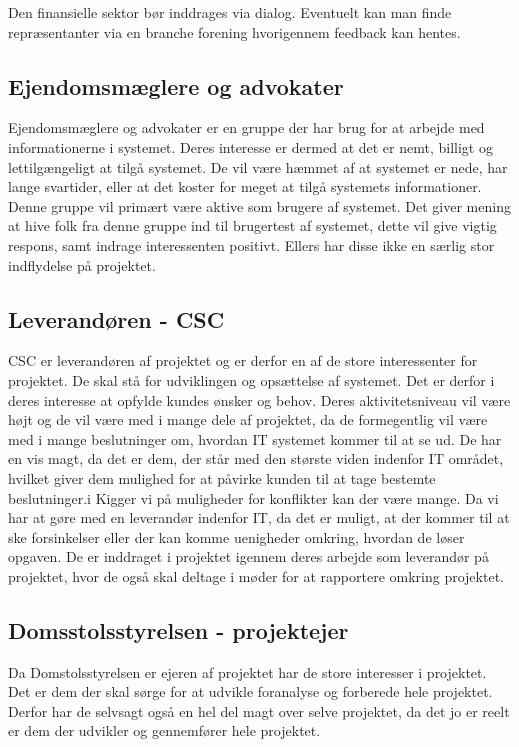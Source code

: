 \documentclass[10pt,a4paper,danish]{article}
\begin{document}
Den finansielle sektor bør inddrages via dialog. Eventuelt kan man finde
repræsentanter via en branche forening hvorigennem feedback kan hentes.

\subsection{Ejendomsmæglere og advokater}

Ejendomsmæglere og advokater er en gruppe der har brug for at arbejde med
informationerne i systemet.
Deres interesse er dermed at det er nemt, billigt og lettilgængeligt at tilgå
systemet. De vil være hæmmet af at systemet er nede, har lange svartider, eller
at det koster for meget at tilgå systemets informationer.
Denne gruppe vil primært være aktive som brugere af systemet.
Det giver mening at hive folk fra denne gruppe ind til brugertest af systemet,
dette vil give vigtig respons, samt indrage interessenten positivt.
Ellers har disse ikke en særlig stor indflydelse på projektet.

\subsection{Leverandøren - CSC}
CSC er leverandøren af projektet og er derfor en af de store interessenter for projektet. De skal stå for udviklingen og opsættelse af systemet. Det er derfor i deres interesse at opfylde kundes ønsker og behov. Deres aktivitetsniveau vil være højt og de vil være med i mange dele af projektet, da de formegentlig vil være med i mange beslutninger om, hvordan IT systemet kommer til at se ud.
De har en vis magt, da det er dem, der står med den største viden indenfor IT området, hvilket giver dem mulighed for at påvirke kunden til at tage bestemte beslutninger.i
Kigger vi på muligheder for konflikter kan der være mange. Da vi har at gøre med en leverandør indenfor IT, da det er muligt, at der kommer til at ske forsinkelser eller der kan komme uenigheder omkring, hvordan de løser opgaven.
De er inddraget i projektet igennem deres arbejde som leverandør på projektet, hvor de også skal deltage i møder for at rapportere omkring projektet. 

\subsection{Domsstolsstyrelsen - projektejer}
Da Domstolsstyrelsen er ejeren af projektet har de store interesser i projektet. Det er dem der skal sørge for at udvikle foranalyse og forberede hele projektet. Derfor har de selvsagt også en hel del magt over selve projektet, da det jo er reelt er dem der udvikler og gennemfører hele projektet.
\end{document}
